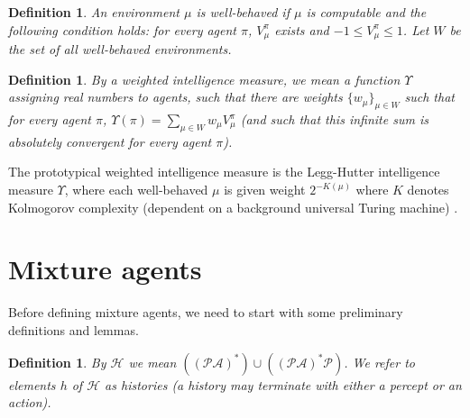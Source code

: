 \documentclass[twoside]{article}
\newtheorem{definition}[theorem]{Definition}
\begin{document}
\begin{definition}
    An environment $\mu$ is \emph{well-behaved} if $\mu$ is computable and the following
    condition holds: for every agent $\pi$, $V^\pi_\mu$ exists and
    $-1\leq V^\pi_\mu\leq 1$. Let $W$ be the set of all well-behaved environments.
\end{definition}

\begin{definition}
\label{performanceaveragerdefn}
    By a \emph{weighted intelligence measure}, we mean a function
    $\Upsilon$ assigning real numbers to agents, such that there
    are weights $\{w_\mu\}_{\mu\in W}$ such that for every agent
    $\pi$, $\Upsilon(\pi)=\sum_{\mu\in W}w_\mu V^\pi_\mu$
    (and such that this infinite sum is absolutely convergent
    for every agent $\pi$).
\end{definition}

The prototypical weighted intelligence measure is the Legg-Hutter intelligence
measure $\Upsilon$, where each well-behaved $\mu$ is given weight $2^{-K(\mu)}$
where $K$ denotes Kolmogorov complexity (dependent on a background universal
Turing machine) \cite{legg2007universal}.

\section{Mixture agents}

Before defining mixture agents, we need to start with some preliminary definitions
and lemmas.

\begin{definition}
    By $\mathcal H$ we mean
    $((\mathcal P\mathcal A)^*)\cup((\mathcal P\mathcal A)^*\mathcal P)$.
    We refer to elements $h$ of $\mathcal H$ as \emph{histories} (a history
    may terminate with either a percept or an action).
\end{definition}
\end{document}
